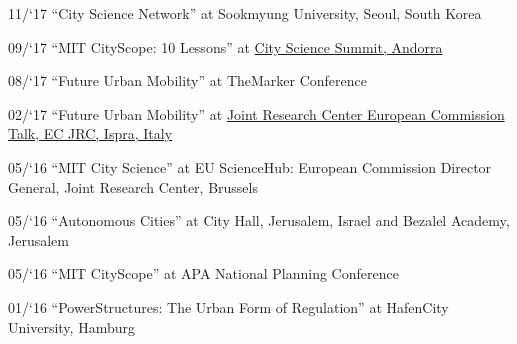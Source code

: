 \begin{tablist}
    \item[11/`17] \tab \enquote{City Science Network} at {Sookmyung University, Seoul, South Korea}

    \item[09/`17] \tab \enquote{MIT CityScope: 10 Lessons} at \href{https://www.youtube.com/watch?v=bRNbap13I5w}{City Science Summit, Andorra}


    \item[08/`17] \tab \enquote{Future Urban Mobility} at {TheMarker Conference}

    \item[02/`17] \tab \enquote{Future Urban Mobility} at \href{https://ec.europa.eu/jrc/en/event/conference/14th-jrc-annual-training-composite-indicators-and-scoreboards} {Joint Research Center European Commission Talk, EC JRC, Ispra, Italy}

    \item[05/`16] \tab \enquote{MIT City Science} at {EU ScienceHub:
        European Commission Director General, Joint Research Center, Brussels}

    \item[05/`16] \tab \enquote{Autonomous Cities} at {City Hall, Jerusalem, Israel and Bezalel Academy, Jerusalem}


    \item[05/`16] \tab \enquote{MIT CityScope} at {APA National Planning Conference}

    \item[01/`16] \tab \enquote{PowerStructures: The Urban Form of Regulation} at {HafenCity University, Hamburg}

\end{tablist}

